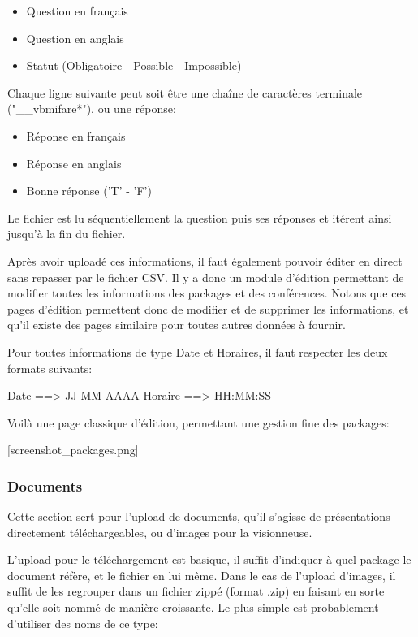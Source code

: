     \begin{itemize}
    \item Question en français
    \item Question en anglais
    \item Statut (Obligatoire - Possible - Impossible)
    \end{itemize}

Chaque ligne suivante peut soit être une chaîne de caractères terminale ("\_\_vbmifare*"), ou une réponse:

    \begin{itemize}
    \item Réponse en français
    \item Réponse en anglais
    \item Bonne réponse ('T' - 'F')
    \end{itemize}

Le fichier est lu séquentiellement la question puis ses réponses et itérent ainsi jusqu'à la fin du fichier.

Après avoir uploadé ces informations, il faut également pouvoir éditer en direct sans repasser par le fichier CSV.
Il y a donc un module d'édition permettant de modifier toutes les informations des packages et des conférences.
Notons que ces pages d'édition permettent donc de modifier et de supprimer les informations, et qu'il existe des pages
similaire pour toutes autres données à fournir.

Pour toutes informations de type Date et Horaires, il faut respecter les deux formats suivants:

Date ==> JJ-MM-AAAA
Horaire ==> HH:MM:SS

Voilà une page classique d'édition, permettant une gestion fine des packages:

[screenshot\_packages.png]

            \subsubsection{Documents}

Cette section sert pour l'upload de documents, qu'il s'agisse de présentations directement téléchargeables, ou d'images pour la visionneuse.

L'upload pour le téléchargement est basique, il suffit d'indiquer à quel package le document réfère, et le fichier en lui même.
Dans le cas de l'upload d'images, il suffit de les regrouper dans un fichier zippé (format .zip) en faisant en sorte qu'elle soit
nommé de manière croissante. Le plus simple est probablement d'utiliser des noms de ce type:


